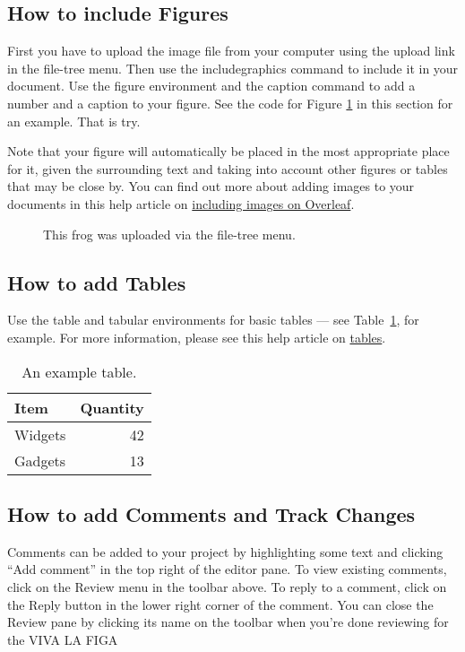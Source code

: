 \documentclass{article}
\begin{document}
	\subsection{How to include Figures}
	
	First you have to upload the image file from your computer using the upload link in the file-tree menu. Then use the includegraphics command to include it in your document. Use the figure environment and the caption command to add a number and a caption to your figure. See the code for Figure \ref{fig:frog} in this section for an example. That is try.
	
	Note that your figure will automatically be placed in the most appropriate place for it, given the surrounding text and taking into account other figures or tables that may be close by. You can find out more about adding images to your documents in this help article on \href{https://www.overleaf.com/learn/how-to/Including_images_on_Overleaf}{including images on Overleaf}.
	
	\begin{figure}
		\centering
		\caption{\label{fig:frog}This frog was uploaded via the file-tree menu.}
	\end{figure}
	
	\subsection{How to add Tables}
	
	Use the table and tabular environments for basic tables --- see Table~\ref{tab:widgets}, for example. For more information, please see this help article on \href{https://www.overleaf.com/learn/latex/tables}{tables}. 
	
	\begin{table}
		\centering
		\begin{tabular}{l|r}
			Item & Quantity \\\hline
			Widgets & 42 \\
			Gadgets & 13
		\end{tabular}
		\caption{\label{tab:widgets}An example table.}
	\end{table}
	
	\subsection{How to add Comments and Track Changes}
	
	Comments can be added to your project by highlighting some text and clicking ``Add comment'' in the top right of the editor pane. To view existing comments, click on the Review menu in the toolbar above. To reply to a comment, click on the Reply button in the lower right corner of the comment. You can close the Review pane by clicking its name on the toolbar when you're done reviewing for the VIVA LA FIGA
	
\end{document}
